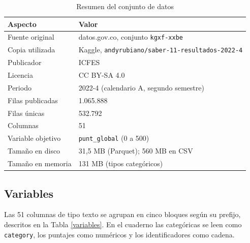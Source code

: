         \begin{table}[H]
            \centering
            \caption{Resumen del conjunto de datos}
            \label{dataset_summary}
            \begin{tabular}{|l|L{5cm}|}
                \hline
                \textbf{Aspecto} & \textbf{Valor} \\
                \hline
                Fuente original & datos.gov.co, conjunto \texttt{kgxf-xxbe} \\
                \hline
                Copia utilizada & Kaggle, \texttt{andyrubiano/\allowbreak saber-11-\allowbreak resultados-2022-4} \\
                \hline
                Publicador & ICFES \\
                \hline
                Licencia & CC BY-SA 4.0 \\
                \hline
                Periodo & 2022-4 (calendario A, segundo semestre) \\
                \hline
                Filas publicadas & 1.065.888 \\
                \hline
                Filas únicas & 532.792 \\
                \hline
                Columnas & 51 \\
                \hline
                Variable objetivo & \texttt{punt\_global} (0 a 500) \\
                \hline
                Tamaño en disco & 31,5 MB (Parquet); 560 MB en CSV \\
                \hline
                Tamaño en memoria & 131 MB (tipos categóricos) \\
                \hline
            \end{tabular}
        \end{table}

    \subsection{Variables}
        Las 51 columnas de tipo texto se agrupan en cinco bloques según su prefijo, descritos
        en la Tabla \ref{variables}. En el cuaderno las categóricas se leen como \texttt{category}, 
        los puntajes como numéricos y los identificadores como cadena.

